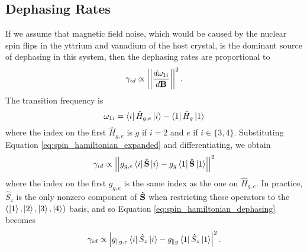 \subsection{Dephasing Rates}
If we assume that magnetic field noise, which would be caused by the nuclear spin flips in the yttrium and vanadium of the host crystal, is the dominant source of dephasing in this system, then the dephasing rates are proportional to
\begin{equation}
    \gamma_{id} \propto \left|\left|\frac{d\omega_{1i}}{d\boldsymbol{\mathbf{B}}}\right|\right|^2.
\end{equation}
The transition frequency is
\begin{equation}
    \omega_{1i} = \left\langle i\right|\hat{H}_{g,e}\left|i\right\rangle - \left\langle1\right|\hat{H}_g\left|1\right\rangle
\end{equation}
where the index on the first $\hat{H}_{g,e}$ is $g$ if $i=2$ and $e$ if $i\in\{3,4\}$. Substituting Equation \ref{eq:spin_hamiltonian_expanded} and differentiating, we obtain
\begin{equation}
    \gamma_{id} \propto \left|\left|g_{g,e} \left\langle i\right|\hat{\boldsymbol{\mathbf{S}}}\left|i\right\rangle - g_g \left\langle1\right|\hat{\boldsymbol{\mathbf{S}}}\left|1\right\rangle\right|\right|^2 \label{eq:spin_hamiltonian_dephasing}
\end{equation}
where the index on the first $g_{g,e}$ is the same index as the one on $\hat{H}_{g,e}$. In practice, $\hat{S}_z$ is the only nonzero component of $\hat{\boldsymbol{\mathbf{S}}}$ when restricting these operators to the $(\left|1\right\rangle, \left|2\right\rangle, \left|3\right\rangle, \left|4\right\rangle)$ basis, and so Equation \ref{eq:spin_hamiltonian_dephasing} becomes
\begin{equation}
    \gamma_{id} \propto \left|g_{\parallel g,e} \left\langle i\right|\hat{S}_z\left|i\right\rangle - g_{\parallel g} \left\langle1\right|\hat{S}_z\left|1\right\rangle\right|^2. \label{eq:spin_hamiltonian_z_dephasing}
\end{equation}

